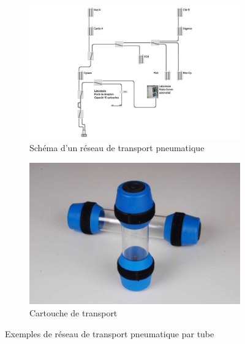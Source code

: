 \begin{figure}[h!]
    \centering
    \begin{subfigure}{0.45\textwidth}
        \centering
        \includegraphics[width=\linewidth]{assets/figures/Hardware/transport_pneu/reseau_pneumatique_hopital.jpg}
        \caption{Schéma d'un réseau de transport pneumatique\footnotemark}
    \end{subfigure}\hfill
    \begin{subfigure}{0.45\textwidth}
        \centering
        \includegraphics[width=\linewidth]{assets/figures/Hardware/transport_pneu/cartouche_transport_pneu.jpg}
        \caption{Cartouche de transport\footnotemark}
    \end{subfigure}
    \caption{Exemples de réseau de transport pneumatique par tube}
\end{figure}
